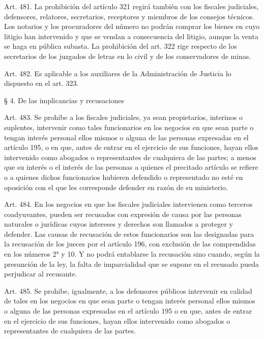     Art. 481. La prohibición del artículo 321 regirá también con los fiscales judiciales, defensores, relatores, secretarios, receptores y miembros de los consejos técnicos.
    Los notarios y los procuradores del número no podrán comprar los bienes en cuyo litigio han intervenido y que se vendan a consecuencia del litigio, aunque la venta se haga en pública subasta.
    La prohibición del art. 322 rige respecto de los secretarios de los juzgados de letras en lo civil y de los conservadores de minas.



    Art. 482. Es aplicable a los auxiliares de la Administración de Justicia lo dispuesto en el art. 323.

    § 4. De las implicancias y recusaciones


    Art. 483. Se prohibe a los fiscales judiciales, ya sean propietarios, interinos o suplentes, intervenir como tales funcionarios en los negocios en que sean parte o tengan interés personal ellos mismos o alguna de las personas expresadas en el artículo 195, o en que, antes de entrar en el ejercicio de sus funciones, hayan ellos intervenido como abogados o representantes de cualquiera de las partes; a menos que su interés o el interés de las personas a quienes el precitado artículo se refiere o a quienes dichos funcionarios hubieren defendido o representado no esté en oposición con el que les corresponde defender en razón de su ministerio.


    Art. 484. En los negocios en que los fiscales judiciales intervienen como terceros coadyuvantes, pueden ser recusados con expresión de causa por las personas naturales o jurídicas cuyos intereses y derechos son llamados a proteger y defender.
    Las causas de recusación de estos funcionarios son las designadas para la recusación de los jueces por el artículo 196, con exclusión de las comprendidas en los números 2° y 10.
    Y no podrá entablarse la recusación sino cuando, según la presunción de la ley, la falta de imparcialidad que se supone en el recusado pueda perjudicar al recusante.



    Art. 485. Se prohibe, igualmente, a los defensores públicos intervenir en calidad de tales en los negocios en que sean parte o tengan interés personal ellos mismos o alguna de las personas expresadas en el artículo 195 o en que, antes de entrar en el ejercicio de sus funciones, hayan ellos intervenido como abogados o representantes de cualquiera de las partes.

